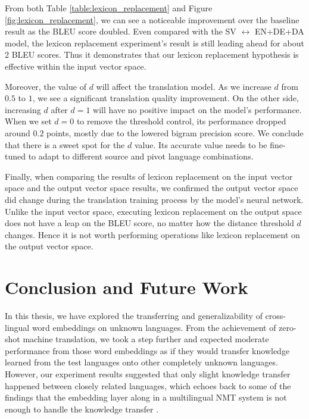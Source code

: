 \documentclass[thesis,fonts=libertine]{cluu}
\begin{document}
From both Table \ref{table:lexicon_replacement} and Figure \ref{fig:lexicon_replacement}, we can see a noticeable improvement over the baseline result as the BLEU score doubled. Even compared with the SV $\leftrightarrow$ EN+DE+DA model, the lexicon replacement experiment's result is still leading ahead for about 2 BLEU scores. Thus it demonstrates that our lexicon replacement hypothesis is effective within the input vector space.

Moreover, the value of $d$ will affect the translation model. As we increase $d$ from $0.5$ to $1$, we see a significant translation quality improvement. On the other side, increasing $d$ after $d=1$ will have no positive impact on the model's performance. When we set $d=0$ to remove the threshold control, its performance dropped around $0.2$ points, mostly due to the lowered bigram precision score. We conclude that there is a sweet spot for the $d$ value. Its accurate value needs to be fine-tuned to adapt to different source and pivot language combinations.

Finally, when comparing the results of lexicon replacement on the input vector space and the output vector space results, we confirmed the output vector space did change during the translation training process by the model's neural network. Unlike the input vector space, executing lexicon replacement on the output space does not have a leap on the BLEU score, no matter how the distance threshold $d$ changes. Hence it is not worth performing operations like lexicon replacement on the output vector space.

\chapter{Conclusion and Future Work}
\label{chap:conclusion}

In this thesis, we have explored the transferring and generalizability of cross-lingual word embeddings on unknown languages. From the achievement of zero-shot machine translation, we took a step further and expected moderate performance from those word embeddings as if they would transfer knowledge learned from the test languages onto other completely unknown languages. However, our experiment results suggested that only slight knowledge transfer happened between closely related languages, which echoes back to some of the findings that the embedding layer along in a multilingual NMT system is not enough to handle the knowledge transfer \parencite{aji-etal-2020-neural}.
\end{document}
